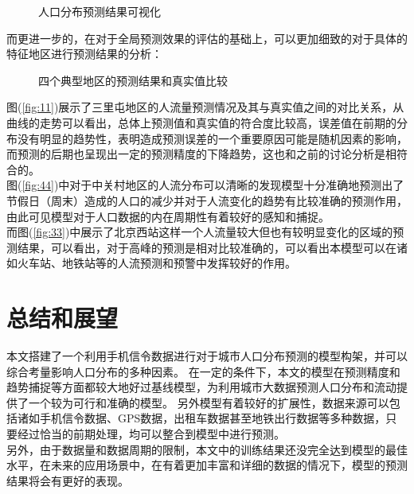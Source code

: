\begin{figure}[ht]
\centering
{}
\hfill
\caption{人口分布预测结果可视化}
\label{fig:peopleheatmap}
\end{figure}
而更进一步的，在对于全局预测效果的评估的基础上，可以更加细致的对于具体的特征地区进行预测结果的分析：
\begin{figure}[ht]
\centering
{}
\hfill
{}
\caption{四个典型地区的预测结果和真实值比较}
\label{fig:region}
\end{figure}
图(\ref{fig:11})展示了三里屯地区的人流量预测情况及其与真实值之间的对比关系，从曲线的走势可以看出，总体上预测值和真实值的符合度比较高，误差值在前期的分布没有明显的趋势性，表明造成预测误差的一个重要原因可能是随机因素的影响，而预测的后期也呈现出一定的预测精度的下降趋势，这也和之前的讨论分析是相符合的。\\
{}\indent 图(\ref{fig:44})中对于中关村地区的人流分布可以清晰的发现模型十分准确地预测出了节假日（周末）造成的人口的减少并对于人流变化的趋势有比较准确的预测作用，由此可见模型对于人口数据的内在周期性有着较好的感知和捕捉。\\
\indent 而图(\ref{fig:33})中展示了北京西站这样一个人流量较大但也有较明显变化的区域的预测结果，可以看出，对于高峰的预测是相对比较准确的，可以看出本模型可以在诸如火车站、地铁站等的人流预测和预警中发挥较好的作用。\\


\section{总结和展望}
本文搭建了一个利用手机信令数据进行对于城市人口分布预测的模型构架，并可以综合考量影响人口分布的多种因素。 在一定的条件下，本文的模型在预测精度和趋势捕捉等方面都较大地好过基线模型，为利用城市大数据预测人口分布和流动提供了一个较为可行和准确的模型。 另外模型有着较好的扩展性，数据来源可以包括诸如手机信令数据、GPS数据，出租车数据甚至地铁出行数据等多种数据，只要经过恰当的前期处理，均可以整合到模型中进行预测。\\
\indent 另外，由于数据量和数据周期的限制，本文中的训练结果还没完全达到模型的最佳水平，在未来的应用场景中，在有着更加丰富和详细的数据的情况下，模型的预测结果将会有更好的表现。